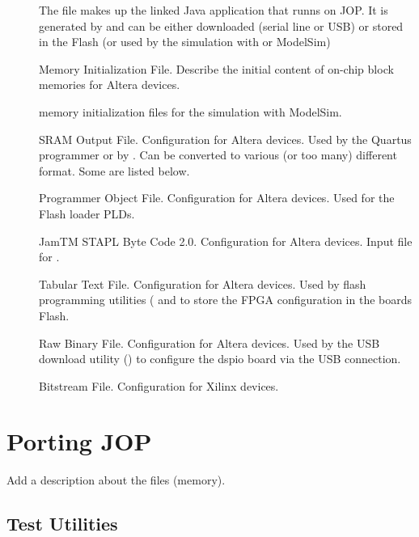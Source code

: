 \begin{description}

\item[] The file makes up the linked Java application that
runns on JOP. It is generated by  and can be either
downloaded (serial line or USB) or stored in the Flash (or used by
the simulation with  or ModelSim)

\item[] Memory Initialization File. Describe the initial
content of on-chip block memories for Altera devices.

\item[] memory initialization files for the simulation
with ModelSim.

\item[] SRAM Output File. Configuration for Altera
devices. Used by the Quartus programmer or by .
Can be converted to various (or too many) different format. Some are
listed below.

\item[] Programmer Object File. Configuration for Altera
devices. Used for the Flash loader PLDs.

\item[] JamTM STAPL Byte Code 2.0. Configuration for Altera
devices. Input file for .

\item[] Tabular Text File. Configuration for Altera
devices. Used by flash programming utilities ( and
 to store the FPGA configuration in the boards Flash.

\item[] Raw Binary File. Configuration for Altera
devices. Used by the USB download utility () to
configure the dspio board via the USB connection.

\item[] Bitstream File. Configuration for Xilinx
devices.

\end{description}

\section{Porting JOP}

Add a description about the files (memory).

\subsection{Test Utilities}

